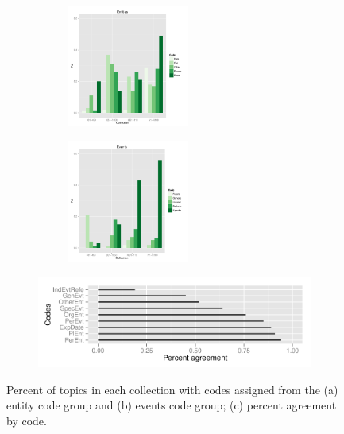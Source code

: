 \documentclass[runningheads,a4paper]{llncs}
\begin{document}
\begin{figure}[!ht]
\centering
\begin{subfigure}{.5\textwidth}
  \centering
\includegraphics[width=6cm, height=4cm]{plots/topic-groups-ent.pdf}
\end{subfigure}%
\begin{subfigure}{.5\textwidth}
  \centering
\includegraphics[width=6cm, height=4cm]{plots/topic-groups-evt.pdf}
\end{subfigure}
\begin{subfigure}{\textwidth}
\includegraphics[width=11cm]{plots/coder-agreement.pdf}
\end{subfigure}
\caption{Percent of topics in each collection with codes assigned from the (a) entity code group and (b) events code group; (c) percent agreement by code.}
\label{fig.codedist}
\end{figure}

\end{document}
